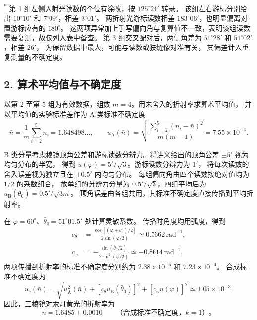 \documentclass[UTF8,zihao=-4]{ctexart}
\begin{document}
\noindent\textsuperscript{*} 第 1 组左侧入射光读数的个位有涂改，按 $125^\circ24'$ 转录。
该组左右游标分别给出 $10^\circ10'$ 和 $7^\circ09'$，相差 $3^\circ01'$。
两折射光游标读数相差 $183^\circ06'$，也明显偏离对置游标应有的 $180^\circ$。
这两项异常加上手写偏向角与复算值不一致，表明该组读数需要复测，故仅列入表中备查。
第 3 组交叉配对后，两侧角差为 $51^\circ28'$ 和 $51^\circ02'$，相差 $26'$，
为保留数据中最大，可能与读数或狭缝像对准有关，
其偏差计入重复测量的不确定度。

\subsection*{2. 算术平均值与不确定度}

以第 2 至第 5 组为有效数据，组数 $m=4$。用未舍入的折射率求算术平均值，
并以平均值的实验标准差作为 A 类标准不确定度
\[
  \bar n=\frac{1}{m}\sum_{i=2}^{5}n_i=1.648498\ldots,\qquad
  u_{\mathrm A}(\bar n)
    =\sqrt{\frac{\sum_{i=2}^{5}(n_i-\bar n)^2}{m(m-1)}}
    =7.55\times10^{-4}.
\]

B 类分量考虑棱镜顶角公差和游标读数分辨力。将讲义给出的顶角公差 $\pm5'$ 视为均匀分布的半宽，
得到 $u(\varphi)=5'/\sqrt{3}$。游标读数分辨力为 $1'$，
将每次读数的舍入误差视为独立且在 $\pm0.5'$ 内均匀分布。
每组偏向角由四个读数按绝对值均为 $1/2$ 的系数组合，
故单组的分辨力分量为 $0.5'/\sqrt{3}$，四组平均后为
$u_{\mathrm B}(\bar\theta_0)=0.5'/\sqrt{3m}$。
顶角误差由各组共用，其标准不确定度直接传播到平均折射率。

在 $\varphi=60^\circ$、$\bar\theta_0=51^\circ01.5'$ 处计算灵敏系数。
传播时角度均用弧度，得到
\[
  \begin{aligned}
    c_\theta
      &=\frac{\cos[(\varphi+\bar\theta_0)/2]}{2\sin(\varphi/2)}
        \simeq 0.5662\,\mathrm{rad}^{-1},\\
    c_\varphi
      &=-\frac{\sin(\bar\theta_0/2)}{2\sin^2(\varphi/2)}
        \simeq -0.8614\,\mathrm{rad}^{-1}.
  \end{aligned}
\]
两项传播到折射率的标准不确定度分别约为 $2.38\times10^{-5}$ 和 $7.23\times10^{-4}$。
合成标准不确定度为
\[
  u_{\mathrm c}(\bar n)
    =\sqrt{u_{\mathrm A}^2(\bar n)+
        [c_\theta u_{\mathrm B}(\bar\theta_0)]^2+
        [c_\varphi u(\varphi)]^2}
    \simeq 1.05\times10^{-3}.
\]
因此，三棱镜对汞灯黄光的折射率为
\[
  \boxed{n=1.6485\pm0.0010}\qquad\text{（合成标准不确定度，}k=1\text{）}。
\]
\end{document}
